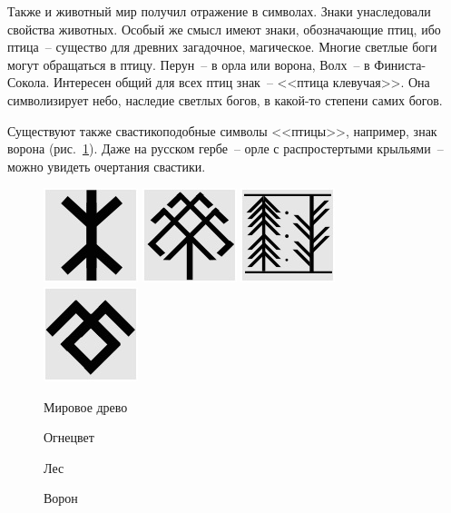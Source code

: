 \documentclass[pscyr,titlepage,chapters]{hedreport}
\begin{document}
  Также и животный мир получил отражение в символах. Знаки унаследовали свойства
  животных. Особый же смысл имеют знаки, обозначающие птиц, ибо птица~-- существо
  для древних загадочное, магическое. Многие светлые боги могут обращаться в
  птицу. Перун~-- в орла или ворона, Волх~-- в Финиста-Сокола. Интересен общий
  для всех птиц знак~-- <<птица клевучая>>. Она символизирует небо, наследие
  светлых богов, в какой-то степени самих богов.

  Существуют также свастикоподобные символы <<птицы>>, например, знак ворона
  (рис.~\ref{pic-bird}). Даже на русском гербе~-- орле с распростертыми
  крыльями~-- можно увидеть очертания свастики.

  \begin{figure}[ht]
    \center
    \includegraphics{sl_5_5} \hspace{1em}
    \includegraphics{sl_5_6} \hspace{1em}
    \includegraphics{sl_5_7} \hspace{1em}
    \includegraphics{sl_5_8} \\
    \parbox{6em}{\caption{Мировое древо}\label{pic-world_tree}} \hspace{1ex}
    \parbox{6em}{\caption{Огнецвет}\label{pic-fire_flower}} \hspace{1ex}
    \parbox{6em}{\caption{Лес}\label{pic-forest}} \hspace{1ex}
    \parbox{6em}{\caption{Ворон}\label{pic-bird}}
  \end{figure}
\end{document}
